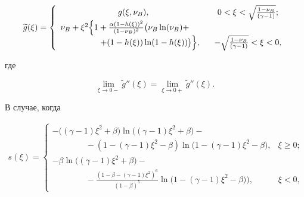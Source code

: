 \begin{gather}

\label{lukashev:gPeregrev}

\widetilde{g}(\xi)=\left\{

\begin{array}{cc}

g(\xi, \nu_B),& 0<\xi< \sqrt{\frac{1-\nu_B}{(\gamma-1)}};

\\

\nu_B+\xi^2\Bigl\{

1+\frac{\alpha(1-h(\xi))^2}{(1-\nu_B)^2}

\bigl(

\nu_B\ln(\nu_B)+ \qquad\\

\qquad \qquad

+(1-h(\xi))\ln(1-h(\xi))\bigr)\Bigr\}

,& -\sqrt{\frac{1-\nu_B}{(\gamma-1)}}<\xi<0,

\end{array}\right.

\end{gather}

где 

$$\lim\limits_{\xi\to 0-} \widetilde{g}''(\xi)=\lim_{\xi\to 0+} \widetilde{g}''(\xi).$$



В случае, когда

\begin{gather}

\label{lukashev:Ns}

s(\xi)=\left\{\begin{array}{cc}

-\bigl((\gamma-1)\xi^2+\beta\bigr) 

\ln \bigl((\gamma-1)\xi^2+\beta\bigr)- \qquad \qquad \qquad \qquad\\

\qquad \qquad

-(1-(\gamma-1)\xi^2-\beta) \ln \bigl(1-(\gamma-1)\xi^2-\beta\bigr),& \xi\ge0;\\

-\beta\ln\bigl((\gamma-1)\xi^2+\beta\bigr)- \qquad \qquad \qquad \qquad \qquad \qquad \qquad \\ 

\qquad \qquad 

-\frac{(1-\beta-(\gamma-1)\xi^2)^6}{(1-\beta)^5} \ln\bigl(1-(\gamma-1)\xi^2-\beta)\bigr),& \xi<0,

\end{array}\right.

\end{gather}

